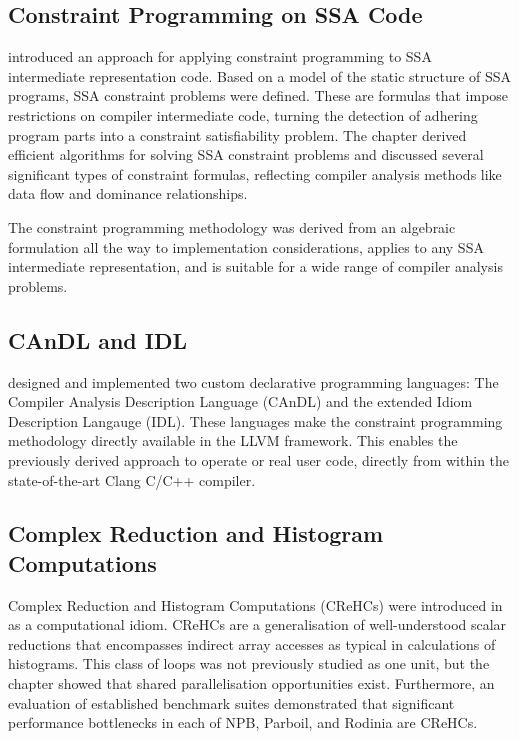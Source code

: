 \subsection*{Constraint Programming on SSA Code}

     introduced an approach for applying constraint
    programming to SSA intermediate representation code.
    Based on a model of the static structure of SSA programs, SSA constraint
    problems were defined.
    These are formulas that impose restrictions on compiler intermediate code,
    turning the detection of adhering program parts into a constraint
    satisfiability problem.
    The chapter derived efficient algorithms for solving SSA constraint problems
    and discussed several significant types of constraint formulas, reflecting
    compiler analysis methods like data flow and dominance relationships.

    The constraint programming methodology was derived from an algebraic
    formulation all the way to implementation considerations, applies
    to any SSA intermediate representation, and is suitable for a wide range of
    compiler analysis problems.

\subsection*{CAnDL and IDL}

     designed and implemented two
    custom declarative programming languages: The Compiler Analysis
    Description Language (CAnDL) and the extended Idiom Description Langauge
    (IDL).
    These languages make the constraint programming methodology directly
    available in the LLVM framework.
    This enables the previously derived approach to operate or real user code,
    directly from within the state-of-the-art Clang C/C++ compiler.

\subsection*{Complex Reduction and Histogram Computations}

    Complex Reduction and Histogram Computations (CReHCs) were introduced in
     as a computational idiom.
    CReHCs are a generalisation of well-understood scalar reductions that
    encompasses indirect array accesses as typical in calculations of
    histograms.
    This class of loops was not previously studied as one unit, but the
    chapter showed that shared parallelisation opportunities exist.
    Furthermore, an evaluation of established benchmark suites demonstrated
    that significant performance bottlenecks in each of NPB, Parboil, and
    Rodinia are CReHCs.

